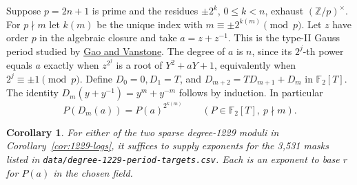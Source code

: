 \documentclass[11pt]{article}
\newtheorem{corollary}[theorem]{Corollary}
\newcommand{\F}{\mathbb F_2}
\begin{document}
Suppose \(p=2n+1\) is prime and the residues \(\pm 2^k\), \(0\le k<n\),
exhaust \((\mathbb Z/p)^\times\). For \(p\nmid m\) let \(k(m)\) be the
unique index with \(m\equiv\pm 2^{k(m)}\pmod p\). Let \(z\) have order
\(p\) in the algebraic closure and take \(a=z+z^{-1}\). This is the
type-II Gauss period studied by
\href{https://www.math.clemson.edu/~sgao/papers/GV95.pdf}{Gao and Vanstone}.
The degree of \(a\) is \(n\), since its \(2^j\)-th power equals \(a\)
exactly when \(z^{2^j}\) is a root of \(Y^2+aY+1\), equivalently when
\(2^j\equiv\pm1\pmod p\). Define \(D_0=0, D_1=T\), and
\(D_{m+2}=TD_{m+1}+D_m\) in \(\F[T]\). The identity
\(D_m(y+y^{-1})=y^m+y^{-m}\) follows by induction. In particular
\[
        P(D_m(a))=P(a)^{2^{k(m)}}\qquad(P\in\F[T],\ p\nmid m).
\]

\begin{corollary}\label{cor:period-targets}
For either of the two sparse degree-1229 moduli in
Corollary~\ref{cor:1229-logs}, it suffices to supply exponents for the 3,531 masks
listed in \nolinkurl{data/degree-1229-period-targets.csv}.
Each is an exponent to base \(r\) for \(P(a)\) in the chosen field.
\end{corollary}
\end{document}
